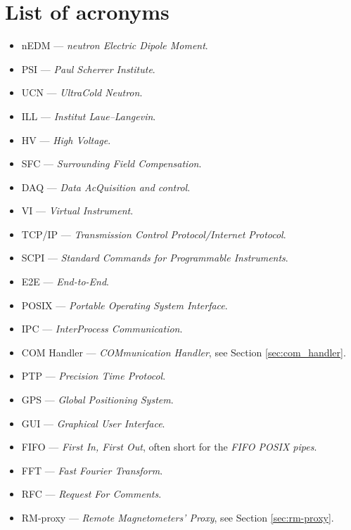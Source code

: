 \chapter*{List of acronyms}

\begin{itemize}
	\item nEDM --- \textit{neutron Electric Dipole Moment}.
	\item PSI --- \textit{Paul Scherrer Institute}.
	\item UCN --- \textit{UltraCold Neutron}.
	\item ILL --- \textit{Institut Laue–Langevin}.
	\item HV --- \textit{High Voltage}.
	\item SFC --- \textit{Surrounding Field Compensation}.
	\item DAQ --- \textit{Data AcQuisition and control}.
	\item VI --- \textit{Virtual Instrument}.
	\item TCP/IP --- \textit{Transmission Control Protocol/Internet Protocol}.
	\item SCPI --- \textit{Standard Commands for Programmable Instruments}.
	\item E2E --- \textit{End-to-End}.
	\item POSIX --- \textit{Portable Operating System Interface}.
	\item IPC --- \textit{InterProcess Communication}.
	\item COM Handler --- \textit{COMmunication Handler}, see Section \ref{sec:com_handler}.
	\item PTP --- \textit{Precision Time Protocol}.
	\item GPS --- \textit{Global Positioning System}.
	\item GUI --- \textit{Graphical User Interface}.
	\item FIFO --- \textit{First In, First Out}, often short for the \textit{FIFO POSIX pipes}.
	\item FFT --- \textit{Fast Fourier Transform}.
	\item RFC --- \textit{Request For Comments}.
	\item RM-proxy --- \textit{Remote Magnetometers' Proxy}, see Section \ref{sec:rm-proxy}.
\end{itemize}
